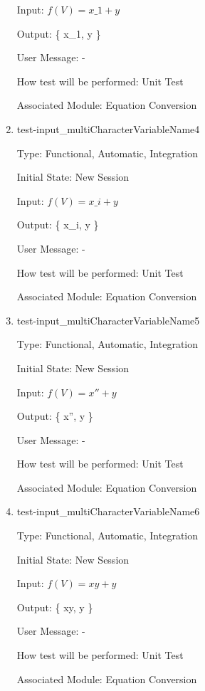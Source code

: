 \documentclass[12pt, titlepage]{article}
\begin{document}
\begin{enumerate}
	Input: $f(V) = x\_1 + y$
	
	Output: \{ x\_1, y \}
	
	User Message: - 
	
	How test will be performed: Unit Test
	
	Associated Module: Equation Conversion\\
	
	\item{test-input\_multiCharacterVariableName4}
	
	Type: Functional, Automatic, Integration
	
	Initial State: New Session
	
	Input: $f(V) = x\_i + y$
	
	Output: \{ x\_i, y \}
	
	User Message: - 
	
	How test will be performed: Unit Test
	
	Associated Module: Equation Conversion\\
	
	\item{test-input\_multiCharacterVariableName5}
	
	Type: Functional, Automatic, Integration
	
	Initial State: New Session
	
	Input: $f(V) = x'' + y$
	
	Output: \{ x'', y \}
	
	User Message: - 
	
	How test will be performed: Unit Test
	
	Associated Module: Equation Conversion\\
	
	\item{test-input\_multiCharacterVariableName6}
	
	Type: Functional, Automatic, Integration
	
	Initial State: New Session
	
	Input: $f(V) = xy + y$
	
	Output: \{ xy, y \}
	
	User Message: - 
	
	How test will be performed: Unit Test
	
	Associated Module: Equation Conversion\\
	
%	
%	
%	
%	
%	
%	
	
\end{enumerate}
\end{document}
